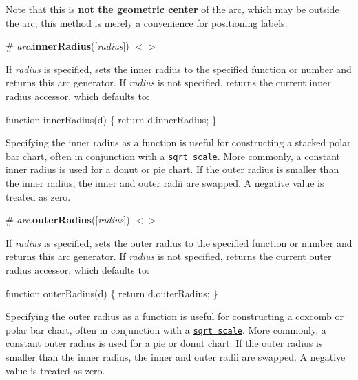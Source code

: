 \href{http://bl.ocks.org/mbostock/9b5a2fd1ce1a146f27e4}{\tt }\href{http://bl.ocks.org/mbostock/c274877f647361f3df7d}{\tt }

Note that this is {\bfseries not the geometric center} of the arc, which may be outside the arc; this method is merely a convenience for positioning labels.

\label{_arc_innerRadius}%
\# {\itshape arc}.{\bfseries inner\+Radius}(\mbox{[}{\itshape radius}\mbox{]}) \href{https://github.com/d3/d3-shape/blob/master/src/arc.js#L230}{\tt $<$$>$}

If {\itshape radius} is specified, sets the inner radius to the specified function or number and returns this arc generator. If {\itshape radius} is not specified, returns the current inner radius accessor, which defaults to\+:


\begin{DoxyCode}
function innerRadius(d) \{
  return d.innerRadius;
\}
\end{DoxyCode}


Specifying the inner radius as a function is useful for constructing a stacked polar bar chart, often in conjunction with a \href{https://github.com/d3/d3-scale#sqrt}{\tt sqrt scale}. More commonly, a constant inner radius is used for a donut or pie chart. If the outer radius is smaller than the inner radius, the inner and outer radii are swapped. A negative value is treated as zero.

\label{_arc_outerRadius}%
\# {\itshape arc}.{\bfseries outer\+Radius}(\mbox{[}{\itshape radius}\mbox{]}) \href{https://github.com/d3/d3-shape/blob/master/src/arc.js#L234}{\tt $<$$>$}

If {\itshape radius} is specified, sets the outer radius to the specified function or number and returns this arc generator. If {\itshape radius} is not specified, returns the current outer radius accessor, which defaults to\+:


\begin{DoxyCode}
function outerRadius(d) \{
  return d.outerRadius;
\}
\end{DoxyCode}


Specifying the outer radius as a function is useful for constructing a coxcomb or polar bar chart, often in conjunction with a \href{https://github.com/d3/d3-scale#sqrt}{\tt sqrt scale}. More commonly, a constant outer radius is used for a pie or donut chart. If the outer radius is smaller than the inner radius, the inner and outer radii are swapped. A negative value is treated as zero.

